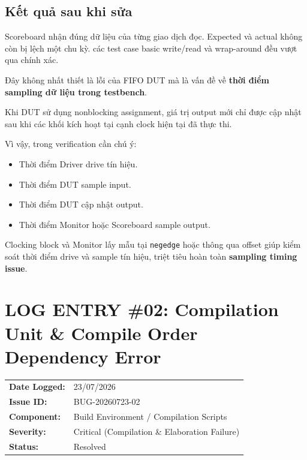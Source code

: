 \documentclass[12pt, a4paper]{article}
\begin{document}
\subsection*{Kết quả sau khi sửa}
Scoreboard nhận đúng dữ liệu của từng giao dịch đọc. Expected và actual không còn bị lệch một chu kỳ. các test case basic write/read và wrap-around đều vượt qua chính xác.

\begin{tcolorbox}[colback=noteBlue!5!white, colframe=noteBlue, title=\textbf{Bài học rút ra}]
Đây không nhất thiết là lỗi của FIFO DUT mà là vấn đề về \textbf{thời điểm sampling dữ liệu trong testbench}.

Khi DUT sử dụng nonblocking assignment, giá trị output mới chỉ được cập nhật sau khi các khối kích hoạt tại cạnh clock hiện tại đã thực thi.

Vì vậy, trong verification cần chú ý:
\begin{itemize}
    \item Thời điểm Driver drive tín hiệu.
    \item Thời điểm DUT sample input.
    \item Thời điểm DUT cập nhật output.
    \item Thời điểm Monitor hoặc Scoreboard sample output.
\end{itemize}
Clocking block và Monitor lấy mẫu tại \texttt{negedge} hoặc thông qua offset giúp kiểm soát thời điểm drive và sample tín hiệu, triệt tiêu hoàn toàn \textbf{sampling timing issue}.
\end{tcolorbox}


\newpage

\section*{LOG ENTRY \#02: Compilation Unit \& Compile Order Dependency Error}

\begin{tcolorbox}[
    colback=bugHeaderBg,
    colframe=mainTitle,
    arc=2pt,
    boxrule=1pt,
    title=\textbf{ISSUE METADATA \& TRACKING INFO}
]
\begin{tabular}{ll}
    \textbf{Date Logged:}   & 23/07/2026 \\
    \textbf{Issue ID:}      & BUG-20260723-02 \\
    \textbf{Component:}     & Build Environment / Compilation Scripts \\
    \textbf{Severity:}      & Critical (Compilation \& Elaboration Failure) \\
    \textbf{Status:}        & Resolved \\
\end{tabular}
\end{tcolorbox}
\end{document}
